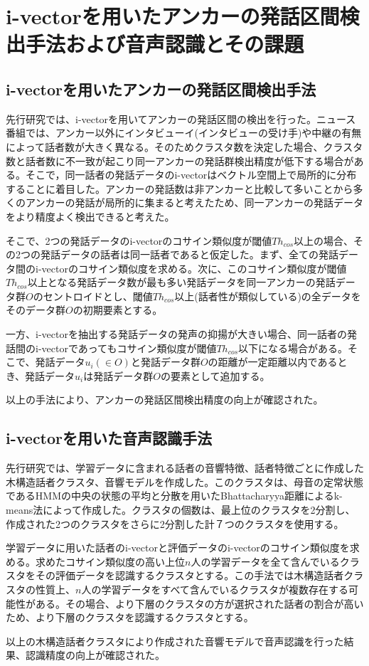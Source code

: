 \chapter{i-vectorを用いたアンカーの発話区間検出手法および音声認識とその課題}

\section{i-vectorを用いたアンカーの発話区間検出手法}
\label{section:clustering}
先行研究\cite{nozaki_gakuseikai}では、i-vectorを用いてアンカーの発話区間の検出を行った。ニュース番組では、アンカー以外にインタビューイ(インタビューの受け手)や中継の有無によって話者数が大きく異なる。そのためクラスタ数を決定した場合、クラスタ数と話者数に不一致が起こり同一アンカーの発話群検出精度が低下する場合がある。そこで，同一話者の発話データのi-vectorはベクトル空間上で局所的に分布することに着目した。アンカーの発話数は非アンカーと比較して多いことから多くのアンカーの発話が局所的に集まると考えたため、同一アンカーの発話データをより精度よく検出できると考えた。\par
そこで、2つの発話データのi-vectorのコサイン類似度が閾値$Th_{cos}$以上の場合、その2つの発話データの話者は同一話者であると仮定した。まず、全ての発話データ間のi-vectorのコサイン類似度を求める。次に、このコサイン類似度が閾値$Th_{cos}$以上となる発話データ数が最も多い発話データを同一アンカーの発話データ群$O$のセントロイドとし、閾値$Th_{cos}$以上(話者性が類似している)の全データをそのデータ群$O$の初期要素とする。\par
一方、i-vectorを抽出する発話データの発声の抑揚が大きい場合、同一話者の発話間のi-vectorであってもコサイン類似度が閾値$Th_{cos}$以下になる場合がある。そこで、発話データ$u_i(\in O)$と発話データ群$O$の距離が一定距離以内であるとき、発話データ$u_i$は発話データ群$O$の要素として追加する。\par
以上の手法により、アンカーの発話区間検出精度の向上が確認された。

\section{i-vectorを用いた音声認識手法}
\label{section:yoshimura_pre_clustering}
先行研究\cite{yoshimura_clustering}では、学習データに含まれる話者の音響特徴、話者特徴ごとに作成した木構造話者クラスタ、音響モデルを作成した。このクラスタは、母音の定常状態であるHMMの中央の状態の平均と分散を用いたBhattacharyya距離によるk-means法によって作成した。クラスタの個数は、最上位のクラスタを2分割し、作成された2つのクラスタをさらに2分割した計７つのクラスタを使用する。\par
学習データに用いた話者のi-vectorと評価データのi-vectorのコサイン類似度を求める。求めたコサイン類似度の高い上位$n$人の学習データを全て含んでいるクラスタをその評価データを認識するクラスタとする。この手法では木構造話者クラスタの性質上、$n$人の学習データをすべて含んでいるクラスタが複数存在する可能性がある。その場合、より下層のクラスタの方が選択された話者の割合が高いため、より下層のクラスタを認識するクラスタとする。\par
以上の木構造話者クラスタにより作成された音響モデルで音声認識を行った結果、認識精度の向上が確認された。

